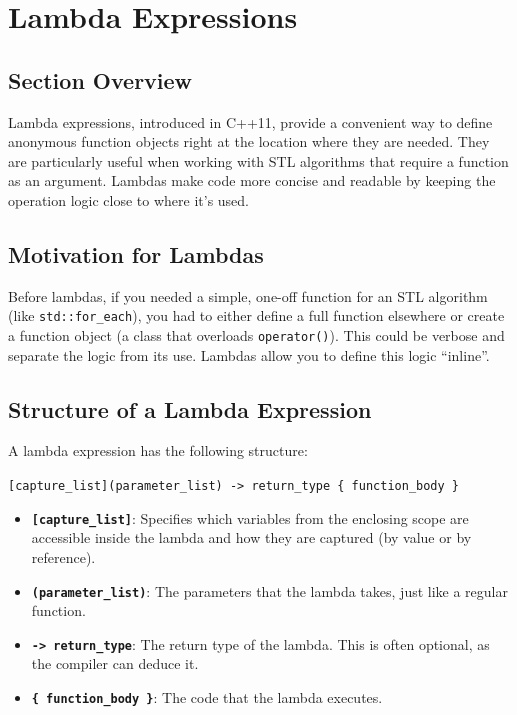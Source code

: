 \section{Lambda Expressions}

\subsection{Section Overview}
Lambda expressions, introduced in C++11, provide a convenient way to define anonymous function objects right at the location where they are needed. They are particularly useful when working with STL algorithms that require a function as an argument. Lambdas make code more concise and readable by keeping the operation logic close to where it's used.

\subsection{Motivation for Lambdas}
Before lambdas, if you needed a simple, one-off function for an STL algorithm (like \texttt{std::for\_each}), you had to either define a full function elsewhere or create a function object (a class that overloads \texttt{operator()}). This could be verbose and separate the logic from its use. Lambdas allow you to define this logic ``inline''.

\subsection{Structure of a Lambda Expression}
A lambda expression has the following structure:
\begin{center}
\texttt{[capture\_list](parameter\_list) -> return\_type \{ function\_body \}}
\end{center}
\begin{itemize}
    \item \textbf{\texttt{[capture\_list]}}: Specifies which variables from the enclosing scope are accessible inside the lambda and how they are captured (by value or by reference).
    \item \textbf{\texttt{(parameter\_list)}}: The parameters that the lambda takes, just like a regular function.
    \item \textbf{\texttt{-> return\_type}}: The return type of the lambda. This is often optional, as the compiler can deduce it.
    \item \textbf{\texttt{\{ function\_body \}}}: The code that the lambda executes.
\end{itemize}

